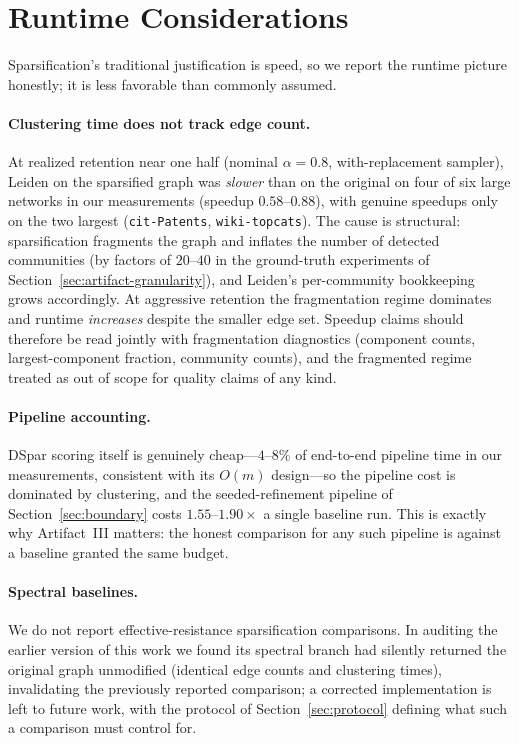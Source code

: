 \section{Runtime Considerations}
\label{sec:runtime}

Sparsification's traditional justification is speed, so we report the runtime picture honestly; it is less favorable than commonly assumed.

\paragraph{Clustering time does not track edge count.}
At realized retention near one half (nominal $\alpha = 0.8$, with-replacement sampler), Leiden on the sparsified graph was \emph{slower} than on the original on four of six large networks in our measurements (speedup $0.58$--$0.88$), with genuine speedups only on the two largest (\texttt{cit-Patents}, \texttt{wiki-topcats}).
The cause is structural: sparsification fragments the graph and inflates the number of detected communities (by factors of $20$--$40$ in the ground-truth experiments of Section~\ref{sec:artifact-granularity}), and Leiden's per-community bookkeeping grows accordingly.
At aggressive retention the fragmentation regime dominates and runtime \emph{increases} despite the smaller edge set.
Speedup claims should therefore be read jointly with fragmentation diagnostics (component counts, largest-component fraction, community counts), and the fragmented regime treated as out of scope for quality claims of any kind.

\paragraph{Pipeline accounting.}
DSpar scoring itself is genuinely cheap---$4$--$8\%$ of end-to-end pipeline time in our measurements, consistent with its $O(m)$ design---so the pipeline cost is dominated by clustering, and the seeded-refinement pipeline of Section~\ref{sec:boundary} costs $1.55$--$1.90\times$ a single baseline run.
This is exactly why Artifact~III matters: the honest comparison for any such pipeline is against a baseline granted the same budget.

\paragraph{Spectral baselines.}
We do not report effective-resistance sparsification comparisons.
In auditing the earlier version of this work we found its spectral branch had silently returned the original graph unmodified (identical edge counts and clustering times), invalidating the previously reported comparison; a corrected implementation is left to future work, with the protocol of Section~\ref{sec:protocol} defining what such a comparison must control for.
